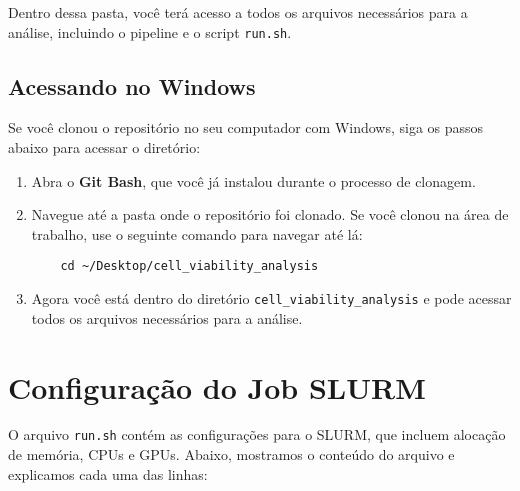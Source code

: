 \documentclass[a4paper, 12pt]{article}
\begin{document}
Dentro dessa pasta, você terá acesso a todos os arquivos necessários para a análise, incluindo o pipeline e o script \texttt{run.sh}.

\subsection{Acessando no Windows}

Se você clonou o repositório no seu computador com Windows, siga os passos abaixo para acessar o diretório:

\begin{enumerate}
    \item Abra o \textbf{Git Bash}, que você já instalou durante o processo de clonagem.
    \item Navegue até a pasta onde o repositório foi clonado. Se você clonou na área de trabalho, use o seguinte comando para navegar até lá:
    \begin{verbatim}
    cd ~/Desktop/cell_viability_analysis
    \end{verbatim}
    \item Agora você está dentro do diretório \texttt{cell\_viability\_analysis} e pode acessar todos os arquivos necessários para a análise.
\end{enumerate}

\section{Configuração do Job SLURM}

O arquivo \texttt{run.sh} contém as configurações para o SLURM, que incluem alocação de memória, CPUs e GPUs. Abaixo, mostramos o conteúdo do arquivo e explicamos cada uma das linhas:
\end{document}
